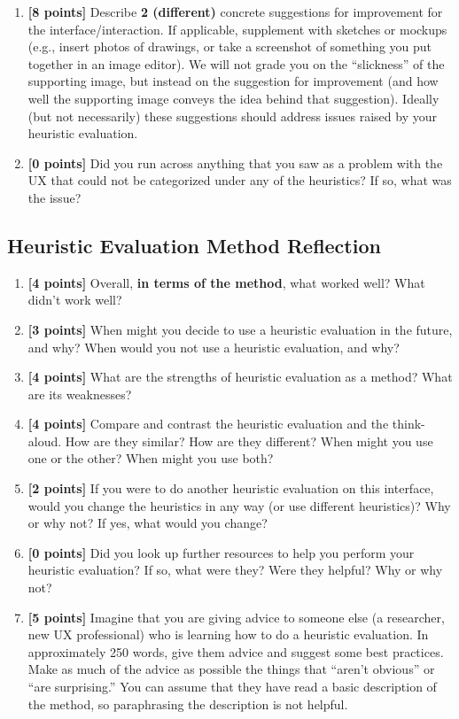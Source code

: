 \documentclass{article}
\begin{document}
\begin{enumerate}
    \item \textbf{[8 points]} Describe \textbf{2 (different)} concrete suggestions for improvement for the interface/interaction. If applicable, supplement with sketches or mockups (e.g., insert photos of drawings, or take a screenshot of something you put together in an image editor). We will not grade you on the ``slickness'' of the supporting image, but instead on the suggestion for improvement (and how well the supporting image conveys the idea behind that suggestion). Ideally (but not necessarily) these suggestions should address issues raised by your heuristic evaluation.
    
    \item \textbf{[0 points]} Did you run across anything that you saw as a problem with the UX that could not be categorized under any of the heuristics? If so, what was the issue?
    
\end{enumerate}

\subsection{Heuristic Evaluation Method Reflection}
\begin{enumerate}
    \item \textbf{[4 points]} Overall, \textbf{in terms of the method}, what worked well? What didn't work well?
    \item \textbf{[3 points]} When might you decide to use a heuristic evaluation in the future, and why? When would you not use a heuristic evaluation, and why?
    \item \textbf{[4 points]} What are the strengths of heuristic evaluation as a method? What are its weaknesses?
    \item \textbf{[4 points]} Compare and contrast the heuristic evaluation and the think-aloud. How are they similar? How are they different? When might you use one or the other? When might you use both?
    \item \textbf{[2 points]} If you were to do another heuristic evaluation on this interface, would you change the heuristics in any way (or use different heuristics)? Why or why not? If yes, what would you change?
    \item \textbf{[0 points]} Did you look up further resources to help you perform your heuristic evaluation? If so, what were they? Were they helpful? Why or why not?
    \item \textbf{[5 points]} Imagine that you are giving advice to someone else (a researcher, new UX professional) who is learning how to do a heuristic evaluation. In approximately 250 words, give them advice and suggest some best practices. Make as much of the advice as possible the things that ``aren’t obvious'' or ``are surprising.'' You can assume that they have read a basic description of the method, so paraphrasing the description is not helpful.
\end{enumerate}
\end{document}
